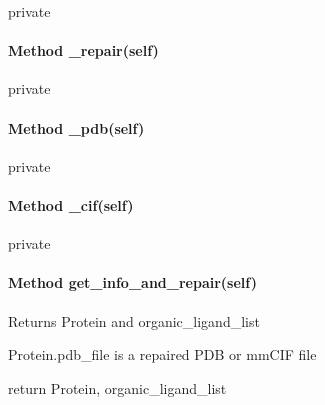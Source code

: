             private

        \paragraph{Method \_repair(self)}

            private

        \paragraph{Method \_pdb(self)}

            private

        \paragraph{Method \_cif(self)}

            private

        \paragraph{Method get\_info\_and\_repair(self)}
        
            Returns Protein and organic\_ligand\_list
            
            Protein.pdb\_file is a repaired PDB or mmCIF file

            return Protein, organic\_ligand\_list